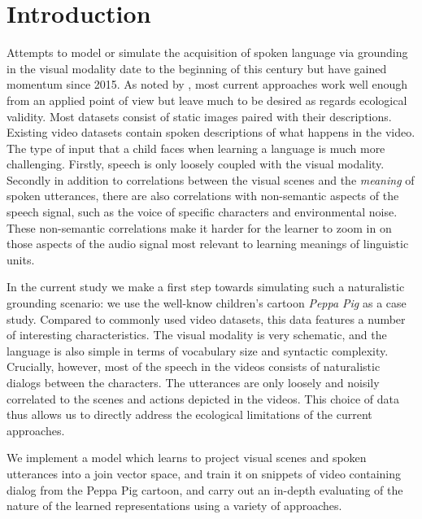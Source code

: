 \section{Introduction}
\label{sec:intro}

Attempts to model or simulate the acquisition of spoken language via
grounding in the visual modality date to the beginning of this century
\citep{roypentland2002learning} but have gained momentum since
2015. As noted by \citet{chrupala-visually-2021}, most current approaches work
well enough from an applied point of view but leave much to be desired
as regards ecological validity. Most datasets consist of static images
paired with their descriptions. Existing video datasets contain spoken
descriptions of what happens in the video. The type of input that a
child faces when learning a language is much more challenging.
Firstly, speech is only loosely coupled with the visual
modality. Secondly in addition to correlations between the visual
scenes and the {\it meaning} of spoken utterances, there are also
correlations with non-semantic aspects of the speech signal, such as
the voice of specific characters and environmental noise. These
non-semantic correlations make it harder for the learner to zoom in
on those aspects of the audio signal most relevant to learning
meanings of linguistic units. 

In the current study we make a first step towards simulating such a
naturalistic grounding scenario: we use the well-know children's
cartoon {\it Peppa Pig} as a case study. Compared to commonly used
video datasets, this data features a number of interesting characteristics.
The visual modality is very schematic, and the language is also simple in
terms of vocabulary size and syntactic complexity. Crucially, however,
most of the speech in the videos consists of naturalistic dialogs between
the characters. The utterances are only loosely and noisily correlated
to the scenes and actions depicted in the videos. This choice of data
thus allows us to directly address the ecological limitations of the
current approaches.

We implement a model which learns to project visual scenes and spoken
utterances into a join vector space, and train it on snippets of
video containing dialog from the Peppa Pig cartoon, and carry out an
in-depth evaluating of the nature of the learned representations using
a variety of approaches.
